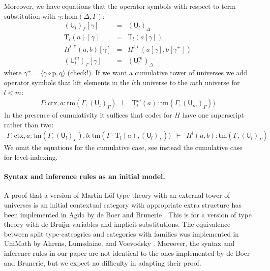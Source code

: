 \documentclass[11pt,a4paper]{article}
\theoremstyle{definition}
\newcommand{\UU}{\mathsf{U}}
\def\UU{\mathsf{U}}
\newcommand{\N}{\mathsf{N}}
\def\Pihat{\Pi}
\def\Hom{\mathrm{hom}}
\newcommand{\ctx}{\mathrm{ctx}}
\newcommand{\tm}{\mathrm{tm}}
\def\p{\mathrm{p}}
\def\q{\mathrm{q}}
\def\U{\mathsf{U}}
\newcommand{\Ta}{\mathrm{T}}
\begin{document}
Moreover, we have equations that the operator symbols with respect to term substitution with $\gamma : \Hom(\Delta,\Gamma)$: 
\begin{eqnarray*}
(\U_l)_\Gamma [ \gamma ] &=& (\U_l)_\Delta\\
\Ta_l(a) [ \gamma ] &=& \Ta_l(a[ \gamma ] )\\
\Pi^{l,l'}(a,b)[ \gamma ] &=& \Pi^{l,l'}(a [ \gamma ], b[ \gamma^+ ])\\
(\UU^m_l)_\Gamma[ \gamma ] &=&(\UU^m_l)_\Delta
\end{eqnarray*}
where $\gamma^+ = \langle \gamma \circ \p, \q \rangle$ (check!).
If we want a cumulative tower of universes we add operator symbols that lift elements in the $l$th universe to the $m$th universe for $l < m$:
\begin{eqnarray*}
\Gamma : \ctx, a : \tm(\Gamma,(\U_{l})_\Gamma) &\vdash& {\Ta^m_{l}}(a) : \tm(\Gamma,(\U_{m})_\Gamma))
\end{eqnarray*}
In the presence of cumulativity it suffices that codes for $\Pi$ have one superscript rather than two:
\begin{eqnarray*}
\Gamma : \ctx,
a : \tm(\Gamma,(\U_{l})_\Gamma),
b :  \tm(\Gamma \cdot \Ta_{l}(a), (\U_{l})_\Gamma))
&\vdash&
 \Pihat^{l}(a,b) : \tm(\Gamma,(\U_{l})_\Gamma)
 \end{eqnarray*}
 We omit the equations for the cumulative case, see instead the cumulative case for level-indexing.

\paragraph{Syntax and inference rules as an initial model.} A proof that a version of Martin-Löf type theory with an external tower of universes  is an initial contextual category with appropriate extra structure has been implemented in Agda by de Boer and Brunerie \cite{Brunerie:initiality,deBoer:lic}. This is for a version of type theory with de Bruijn variables and implicit substitutions. The equivalence between split type-cateogries and categories with families was implemented in UniMath by Ahrens, Lumsdaine, and Voevodsky \cite{AhrensLV18}. Moreover, the syntax and inference rules in our paper \cite{BezemCDE22} are not identical to the ones implemented by de Boer and Brunerie, but we expect no difficulty in adapting their proof.
\end{document}
